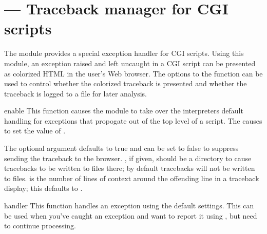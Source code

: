 \section{ ---
         Traceback manager for CGI scripts}



The  module provides a special exception handler for CGI
scripts.  Using this module, an exception raised and left uncaught in
a CGI script can be presented as colorized HTML in the user's Web
browser.  The options to the  function can be used
to control whether the colorized traceback is presented and whether
the traceback is logged to a file for later analysis.


\begin{funcdesc}{enable}{}
  This function causes the  module to take over the
  interpreters default handling for exceptions that propogate out of
  the top level of a script.  The causes  to set the
  value of .

  The optional argument  defaults to true and can be set
  to false to suppress sending the traceback to the browser.
  , if given, should be a directory to cause tracebacks to
  be written to files there; by default tracebacks will not be written
  to files.   is the number of lines of context around
  the offending line in a traceback display; this defaults to
  .
\end{funcdesc}

\begin{funcdesc}{handler}{}
  This function handles an exception using the default settings.  This
  can be used when you've caught an exception and want to report it
  using , but need to continue processing.
\end{funcdesc}
